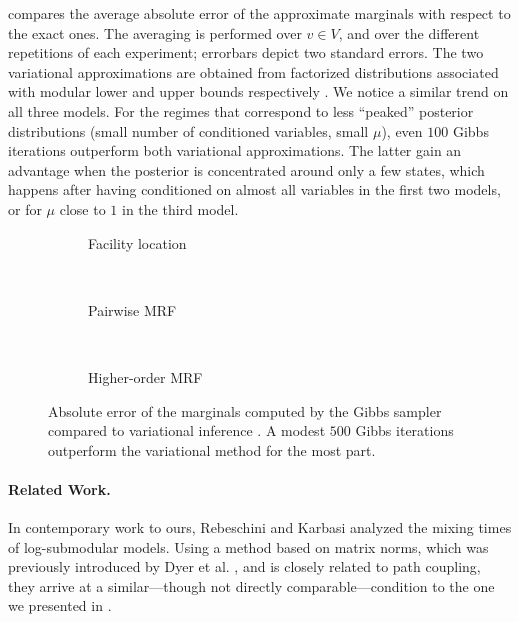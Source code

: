  compares the average absolute error of the approximate marginals with respect to the exact ones.
The averaging is performed over $v \in V$, and over the different repetitions of each experiment; errorbars depict two standard errors.
The two variational approximations are obtained from factorized distributions associated with modular lower and upper bounds respectively \cite{djolonga14}.
We notice a similar trend on all three models.
For the regimes that correspond to less ``peaked'' posterior distributions (small number of conditioned variables, small $\mu$), even $100$ Gibbs iterations outperform both variational approximations.
The latter gain an advantage when the posterior is concentrated around only a few states, which happens after having conditioned on almost all variables in the first two models, or for $\mu$ close to $1$ in the third model.

\setlength{}
\setlength{}
\newcommand{\subflen}{\textwidth}
\begin{figure}[tb]
  \begin{subfigure}[b]{\subflen}
    \centering
    
    \caption{Facility location}
    \label{fig:exp1}
  \end{subfigure}\\[1em]
  \begin{subfigure}[b]{\subflen}
    \centering
    
    \caption{Pairwise MRF}
    \label{fig:exp2}
  \end{subfigure}\\[1em]
  \begin{subfigure}[b]{\subflen}
    \centering
    
    \caption{Higher-order MRF}
    \label{fig:exp3}
  \end{subfigure}
  \caption{Absolute error of the marginals computed by the Gibbs sampler compared to variational inference \cite{djolonga14}.
  	A modest $500$ Gibbs iterations outperform the variational method for the most part.}
  \label{fig:exp}
\end{figure}


\paragraph{Related Work.}
In contemporary work to ours, Rebeschini and Karbasi \cite{rebeschini15} analyzed the mixing times of log-submodular models.
Using a method based on matrix norms, which was previously introduced by Dyer et al. \cite{dyer09}, and is closely related to path coupling, they arrive at a similar---though not directly comparable---condition to the one we presented in .

